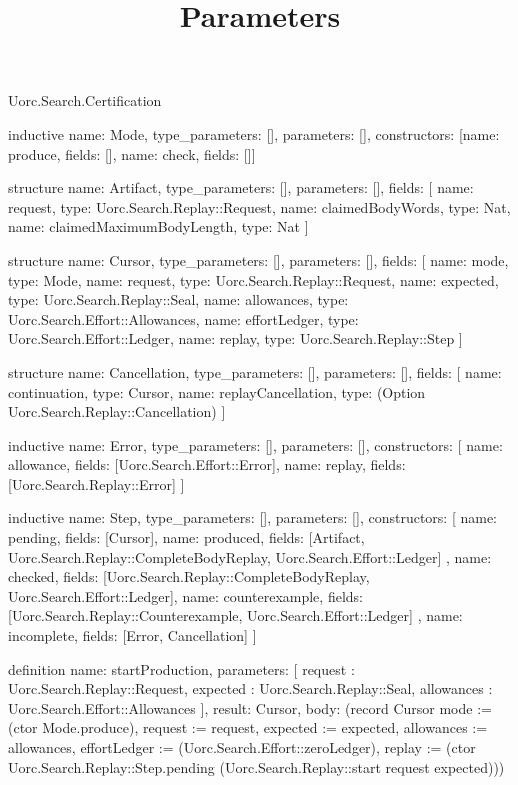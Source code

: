 \begin{lexlean}{Uorc.Search.Certification}
\title{Parameters}
\begin{semanticmodule}
inductive{
  name: Mode,
  type_parameters: [],
  parameters: [],
  constructors: [{name: produce, fields: []}, {name: check, fields: []}]
}

structure{
  name: Artifact,
  type_parameters: [],
  parameters: [],
  fields: [
    {name: request, type: Uorc.Search.Replay::Request},
    {name: claimedBodyWords, type: Nat},
    {name: claimedMaximumBodyLength, type: Nat}
  ]
}

structure{
  name: Cursor,
  type_parameters: [],
  parameters: [],
  fields: [
    {name: mode, type: Mode},
    {name: request, type: Uorc.Search.Replay::Request},
    {name: expected, type: Uorc.Search.Replay::Seal},
    {name: allowances, type: Uorc.Search.Effort::Allowances},
    {name: effortLedger, type: Uorc.Search.Effort::Ledger},
    {name: replay, type: Uorc.Search.Replay::Step}
  ]
}

structure{
  name: Cancellation,
  type_parameters: [],
  parameters: [],
  fields: [
    {name: continuation, type: Cursor},
    {name: replayCancellation, type: (Option Uorc.Search.Replay::Cancellation)}
  ]
}

inductive{
  name: Error,
  type_parameters: [],
  parameters: [],
  constructors: [
    {name: allowance, fields: [Uorc.Search.Effort::Error]},
    {name: replay, fields: [Uorc.Search.Replay::Error]}
  ]
}

inductive{
  name: Step,
  type_parameters: [],
  parameters: [],
  constructors: [
    {name: pending, fields: [Cursor]},
    {
      name: produced,
      fields: [Artifact, Uorc.Search.Replay::CompleteBodyReplay, Uorc.Search.Effort::Ledger]
    },
    {name: checked, fields: [Uorc.Search.Replay::CompleteBodyReplay, Uorc.Search.Effort::Ledger]},
    {
      name: counterexample,
      fields: [Uorc.Search.Replay::Counterexample, Uorc.Search.Effort::Ledger]
    },
    {name: incomplete, fields: [Error, Cancellation]}
  ]
}

definition{
  name: startProduction,
  parameters: [
    request : Uorc.Search.Replay::Request,
    expected : Uorc.Search.Replay::Seal,
    allowances : Uorc.Search.Effort::Allowances
  ],
  result: Cursor,
  body: (record Cursor {mode := (ctor Mode.produce), request := request, expected := expected, allowances := allowances, effortLedger := (Uorc.Search.Effort::zeroLedger), replay := (ctor Uorc.Search.Replay::Step.pending (Uorc.Search.Replay::start request expected))})
}


\end{semanticmodule}
\end{lexlean}
